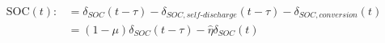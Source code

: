 \begin{equation}
\begin{split}
	\text{SOC}(t) :&= \delta_{SOC}(t-\tau) - \delta_{SOC,self\text{-}discharge}(t-\tau) - \delta_{SOC,conversion}(t)\\
	&= (1-\mu)\delta_{SOC}(t-\tau) - \hat{\eta}\delta_{SOC}(t)	
\end{split}
\end{equation}
